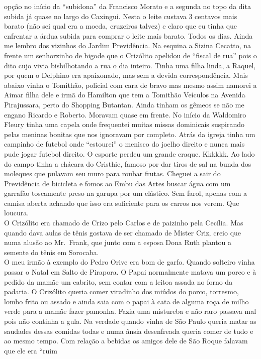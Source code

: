 \documentclass[12pt,brazil,]{book}
\begin{document}
opção no início da ``subidona'' da Francisco Morato e a segunda no topo
da dita subida já quase no largo do Caxingui. Nesta o leite custava 3
centavos mais barato (não sei qual era a moeda, cruzeiros talvez) e
claro que eu tinha que enfrentar a árdua subida para comprar o leite
mais barato. Todos os dias. Ainda me lembro dos vizinhos do Jardim
Previdência. Na esquina a Sizina Cecatto, na frente um senhorzinho de
bigode que o Crizólito apelidou de ``fiscal de rua'' pois o dito cujo
vivia bisbilhotando a rua o dia inteiro. Tinha uma filha linda, a
Raquel, por quem o Delphino era apaixonado, mas sem a devida
correspondência. Mais abaixo vinha o Tomithão, policial com cara de
bravo mas mesmo assim namorei a Aimar filha dele e irmã do Hamilton que
tem a Tomithão Veículos na Avenida Pirajussara, perto do Shopping
Butantan. Ainda tinham os gêmeos se não me engano Ricardo e Roberto.
Moravam quase em frente. No início da Waldomiro Fleury tinha uma capela
onde frequentei muitas missas dominicais suspirando pelas meninas
bonitas que nos ignoravam por completo. Atrás da igreja tinha um
campinho de futebol onde ``estourei'' o menisco do joelho direito e
nunca mais pude jogar futebol direito. O esporte perdeu um grande
craque. Kkkkkk. Ao lado do campo tinha a chácara do Cristhie, famoso por
dar tiros de sal na bunda dos moleques que pulavam seu muro para roubar
frutas. Cheguei a sair do Previdência de bicicleta e fomos ao Embu das
Artes buscar água com um garrafão toscamente preso na garupa por um
elástico. Sem farol, apenas com a camisa aberta achando que isso era
suficiente para os carros nos verem. Que loucura.\\
O Crizólito era chamado de Crizo pelo Carlos e de paizinho pela Cecília.
Mas quando dava aulas de tênis gostava de ser chamado de Mister Criz,
creio que numa alusão ao Mr.~Frank, que junto com a esposa Dona Ruth
plantou a semente do tênis em Sorocaba.\\
O meu irmão à exemplo do Pedro Orive era bom de garfo. Quando solteiro
vinha passar o Natal em Salto de Pirapora. O Papai normalmente matava um
porco e à pedido da mamãe um cabrito, sem contar com a leitoa assada no
forno da padaria. O Crizólito queria comer viradinho dos miúdos do
porco, torresmo, lombo frito ou assado e ainda saia com o papai à cata
de alguma roça de milho verde para a mamãe fazer pamonha. Fazia uma
mistureba e não raro passava mal pois não continha a gula. Na verdade
quando vinha de São Paulo queria matar as saudades dessas comidas todas
e numa ânsia desenfreada queria comer de tudo e ao mesmo tempo. Com
relação a bebidas os amigos dele de São Roque falavam que ele era ``ruim
\end{document}
